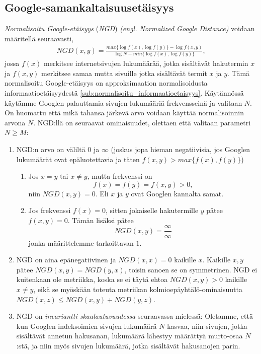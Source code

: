 \documentclass[12pt,finnish]{tktltiki2}
\theoremstyle{definition}
\theoremstyle{remark}
\newcommand{\engl}[1]{\emph{(engl. #1)}}
\begin{document}
    \subsection{Google-samankaltaisuusetäisyys} %
    \label{sub:google_samankaltaisuusetaisyys}
      \emph{Normalisoitu Google-etäisyys} (\emph{NGD}) \engl{Normalized Google Distance}  voidaan määritellä seuraavasti,
      \begin{align}
        NGD(x,y) = \frac{max\{\log{f(x)},\log{f(y)}\}-\log{f(x,y)}}{\log{N}-min\{\log{f(x)},\log{f(y)}\}},
      \end{align}
      jossa $f(x)$ merkitsee internetsivujen lukumäärää, jotka sisältävät hakutermin $x$ ja $f(x,y)$ merkitsee samaa mutta sivuille jotka sisältävät termit $x$ ja $y$.
      Tämä normalisoitu Google-etäisyys on approksimaation normalisoidusta informaatioetäisyydestä \ref{sub:normalisoitu_informaatioetaisyys}.
      Käytännössä käytämme Googlen palauttamia sivujen lukumääriä frekvensseinä ja valitaan $N$.
      On huomattu että mikä tahansa järkevä arvo voidaan käyttää normalisoinnin arvona $N$.
      NGD:llä on seuraavat ominaisuudet, olettaen että valitaan parametri $N\geq{}M$:
      \begin{enumerate}
        \item NGD:n arvo on väliltä $0$ ja $\infty$ (joskus jopa hieman negatiivisia, jos Googlen lukumäärät ovat epäluotettavia ja täten $f(x,y) > max\{f(x),f(y)\}$)
        \begin{enumerate}
          \item Jos $x=y$ tai $x\neq{}y$, mutta frekvenssi on
          \[
            f(x) = f(y) = f(x,y) > 0,
          \]
          niin $NGD(x,y)=0$. Eli $x$ ja $y$ ovat Googlen kannalta samat.
          \item Jos frekvenssi $f(x)=0$, sitten jokaiselle hakutermille $y$ pätee $f(x,y)=0$. Tämän lisäksi pätee
          \[
            NGD(x,y)=\frac{\infty}{\infty}
          \]
          jonka määrittelemme tarkoittavan $1$.
        \end{enumerate}
        \item NGD on aina epänegatiivinen ja $NGD(x,x)=0$ kaikille $x$. Kaikille $x,y$ pätee $NGD(x,y)=NGD(y,x)$, toisin sanoen se on symmetrinen. NGD ei kuitenkaan ole metriikka, koska se ei täytä ehtoa $NGD(x,y) > 0$ kaikille $x\neq{}y$, eikä se myöskään toteuta metriikan kolmioepäyhtälö-ominaisuutta $NGD(x,z) \leq NGD(x,y) + NGD(y,z)$. \cite{cilibrasi2007google}
        \item NGD on \emph{invariantti skaalautuvuudessa} seuraavassa mielessä: Oletamme, että kun Googlen indeksoimien sivujen lukumäärä $N$ kasvaa, niin sivujen, jotka sisältävät annetun hakusanan, lukumäärä lähestyy määrättyä murto-osaa $N$:stä, ja niin myös sivujen lukumäärä, jotka sisältävät hakusanojen parin.
      \end{enumerate}
\end{document}
